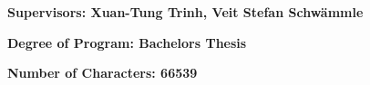 \begin{center}

\vspace{1cm}

\textbf{Supervisors: Xuan-Tung Trinh, Veit Stefan Schwämmle}

\vspace{0.5cm}

\textbf{Degree of Program: Bachelors Thesis}

\vspace{0.5cm}

\textbf{Number of Characters: 66539}

\end{center}


\newpage
